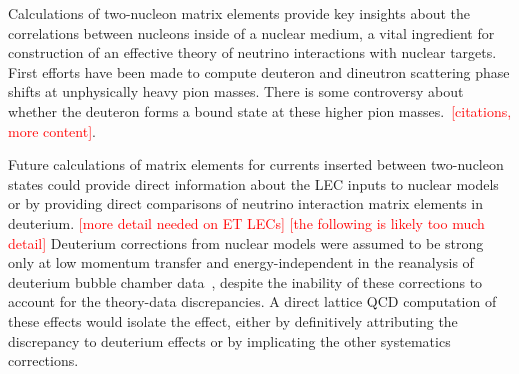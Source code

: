 Calculations of two-nucleon matrix elements provide key insights
 about the correlations between nucleons inside of a nuclear medium,
 a vital ingredient for construction of an effective theory
 of neutrino interactions with nuclear targets.
First efforts have been made to compute deuteron and dineutron scattering phase shifts
 at unphysically heavy pion masses.
There is some controversy about whether the deuteron forms a
 bound state at these higher pion masses.~\textcolor{red}{[citations, more content]}.

Future calculations of matrix elements for currents inserted between
 two-nucleon states could provide direct information about the LEC inputs to nuclear
 models~\cite{Drischler:2019xuo}
 or by providing direct comparisons of neutrino interaction matrix elements in deuterium.
\textcolor{red}{[more detail needed on ET LECs]}
\textcolor{red}{[the following is likely too much detail]}
Deuterium corrections from nuclear models were assumed to be strong only at low momentum transfer
 and energy-independent in the reanalysis of deuterium bubble chamber data~\cite{Meyer:2016oeg},
 despite the inability of these corrections to account for the theory-data discrepancies.
A direct lattice QCD computation of these effects would isolate the effect,
 either by definitively attributing the discrepancy to deuterium effects
 or by implicating the other systematics corrections.

